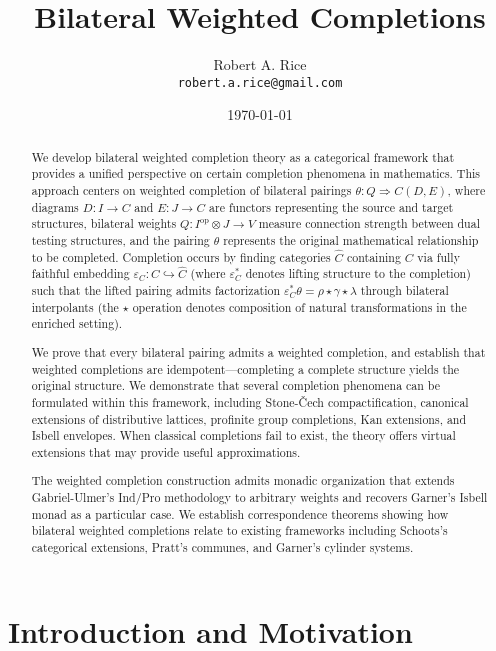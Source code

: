 \documentclass[11pt]{article}
\title{Bilateral Weighted Completions}
\author{Robert A. Rice\\
\texttt{robert.a.rice@gmail.com}}
\date{\today}
\theoremstyle{plain}
\theoremstyle{definition}
\theoremstyle{remark}
\begin{document}
\maketitle

\begin{abstract}
We develop bilateral weighted completion theory as a categorical framework that provides a unified perspective on certain completion phenomena in mathematics. This approach centers on weighted completion of bilateral pairings $\theta : Q \Rightarrow C(D, E)$, where diagrams $D : I \to C$ and $E : J \to C$ are functors representing the source and target structures, bilateral weights $Q : I^{\mathrm{op}} \otimes J \to V$ measure connection strength between dual testing structures, and the pairing $\theta$ represents the original mathematical relationship to be completed. Completion occurs by finding categories $\widehat{C}$ containing $C$ via fully faithful embedding $\varepsilon_C : C \hookrightarrow \widehat{C}$ (where $\varepsilon_C^*$ denotes lifting structure to the completion) such that the lifted pairing admits factorization $\varepsilon_C^* \theta = \rho \star \gamma \star \lambda$ through bilateral interpolants (the $\star$ operation denotes composition of natural transformations in the enriched setting).

We prove that every bilateral pairing admits a weighted completion, and establish that weighted completions are idempotent---completing a complete structure yields the original structure. We demonstrate that several completion phenomena can be formulated within this framework, including Stone-\v{C}ech compactification, canonical extensions of distributive lattices, profinite group completions, Kan extensions, and Isbell envelopes. When classical completions fail to exist, the theory offers virtual extensions that may provide useful approximations.

The weighted completion construction admits monadic organization that extends Gabriel-Ulmer's Ind/Pro methodology to arbitrary weights and recovers Garner's Isbell monad as a particular case. We establish correspondence theorems showing how bilateral weighted completions relate to existing frameworks including Schoots's categorical extensions, Pratt's communes, and Garner's cylinder systems.
\end{abstract}

\section{Introduction and Motivation}
\end{document}
